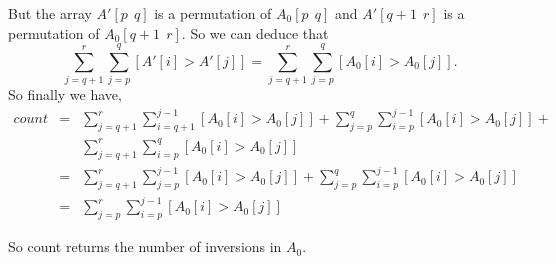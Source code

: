 \documentclass[a4paper,12pt]{article}
\begin{document}
But the array $A'[p\ \ q]$ is a permutation of $A_0[p\ \ q]$ and
$A'[q+1\ \ r]$ is a permutation of $A_0[q+1\ \ r]$.  So we can deduce
that 
\[ \sum_{j=q+1}^r \sum_{j=p}^q[A'[i] > A'[j]] =
\sum_{j=q+1}^r \sum_{j=p}^q[A_0[i] > A_0[j]].\]
So finally we have,
\begin{eqnarray*}
count &=& \sum_{j=q+1}^r\sum_{i=q+1}^{j-1}[A_0[i] > A_0[j]] +
\sum_{j=p}^q \sum_{i=p}^{j-1} [A_0[i] > A_0[j]] +\\&&
\sum_{j=q+1}^r \sum_{i=p}^q [A_0[i] > A_0[j]]\\&=&
\sum_{j=q+1}^r \sum_{j=p}^{j-1}[A_0[i] > A_0[j]] +
\sum_{j=p}^q \sum_{i=p}^{j-1}[A_0[i] > A_0[j]]\\&=&
\sum_{j=p}^r\sum_{i=p}^{j-1}[A_0[i] > A_0[j]]
\end{eqnarray*}

So count returns the number of inversions in $A_0$.
\end{document}
